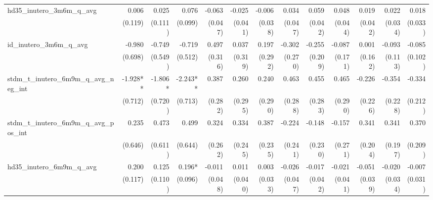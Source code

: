 \begin{tabular}{lrrrrrrrrrrrr}
hd35\_inutero\_3m6m\_q\_avg                 &        0.006 &        0.025 &        0.076 &       -0.063 &       -0.025 &       -0.006 &        0.034 &        0.059 &        0.048 &        0.019 &        0.022 &        0.018 \\ 
                                            &      (0.119) &      (0.111) &      (0.099) &      (0.047) &      (0.041) &      (0.038) &      (0.047) &      (0.042) &      (0.044) &      (0.042) &      (0.034) &      (0.033) \\ 
id\_inutero\_3m6m\_q\_avg                   &       -0.980 &       -0.749 &       -0.719 &        0.497 &        0.037 &        0.197 &       -0.302 &       -0.255 &       -0.087 &        0.001 &       -0.093 &       -0.085 \\ 
                                            &      (0.698) &      (0.549) &      (0.512) &      (0.316) &      (0.319) &      (0.292) &      (0.270) &      (0.209) &      (0.171) &      (0.162) &      (0.113) &      (0.102) \\ 
stdm\_t\_inutero\_6m9m\_q\_avg\_neg\_int    &     -1.928** &      -1.806* &     -2.243** &        0.387 &        0.260 &        0.240 &        0.463 &        0.455 &        0.465 &       -0.226 &       -0.354 &       -0.334 \\ 
                                            &      (0.712) &      (0.720) &      (0.713) &      (0.282) &      (0.295) &      (0.290) &      (0.288) &      (0.283) &      (0.290) &      (0.226) &      (0.228) &      (0.212) \\ 
stdm\_t\_inutero\_6m9m\_q\_avg\_pos\_int    &        0.235 &        0.473 &        0.499 &        0.324 &        0.334 &        0.387 &       -0.224 &       -0.148 &       -0.157 &        0.341 &        0.341 &        0.370 \\ 
                                            &      (0.646) &      (0.611) &      (0.644) &      (0.262) &      (0.245) &      (0.235) &      (0.241) &      (0.230) &      (0.271) &      (0.204) &      (0.197) &      (0.209) \\ 
hd35\_inutero\_6m9m\_q\_avg                 &        0.200 &        0.125 &       0.196* &       -0.011 &        0.011 &        0.003 &       -0.026 &       -0.017 &       -0.021 &       -0.051 &       -0.020 &       -0.007 \\ 
                                            &      (0.117) &      (0.110) &      (0.096) &      (0.048) &      (0.040) &      (0.033) &      (0.047) &      (0.042) &      (0.041) &      (0.039) &      (0.034) &      (0.031) \\ 

\end{tabular}
